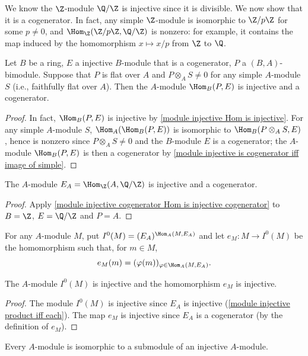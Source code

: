 \begin{example}
We know the $\Z$-module $\Q/\Z$ is injective since it is divisible. We now show that it is a cogenerator. In fact, any simple $\Z$-module is isomorphic to $\Z/p\Z$ for some $p\neq 0$, and $\Hom_\Z(\Z/p\Z,\Q/\Z)$ is nonzero: for example, it contains the map induced by the homomorphism $x\mapsto x/p$ from $\Z$ to $\Q$.
\end{example}
\begin{proposition}\label{module injective cogenerator Hom is injective cogenerator}
Let $B$ be a ring, $E$ a injective $B$-module that is a cogenerator, $P$ a $(B,A)$-bimodule. Suppose that $P$ is flat over $A$ and $P\otimes_AS\neq 0$ for any simple $A$-module $S$ (i.e., faithfully flat over $A$). Then the $A$-module $\Hom_B(P,E)$ is injective and a cogenerator.
\end{proposition}
\begin{proof}
In fact, $\Hom_B(P,E)$ is injective by \cref{module injective Hom is injective}. For any simple $A$-module $S$, $\Hom_A(\Hom_B(P,E))$ is isomorphic to $\Hom_B(P\otimes_AS,E)$, hence is nonzero since $P\otimes_AS\neq 0$ and the $B$-module $E$ is a cogenerator; the $A$-module $\Hom_B(P,E)$ is then a cogenerator by \cref{module injective is cogenerator iff image of simple}.
\end{proof}
\begin{corollary}\label{module Hom(A,Q/Z) is cogenerator}
The $A$-module $E_A=\Hom_{\Z}(A,\Q/\Z)$ is injective and a cogenerator.
\end{corollary}
\begin{proof}
Apply \cref{module injective cogenerator Hom is injective cogenerator} to $B=\Z$, $E=\Q/\Z$ and $P=A$.
\end{proof}
For any $A$-module $M$, put $I^0(M)=(E_A)^{\Hom_A(M,E_A)}$ and let $e_M:M\to I^0(M)$ be the homomorphism such that, for $m\in M$,
\[e_M(m)=(\varphi(m))_{\varphi\in\Hom_A(M,E_A)}.\]
\begin{corollary}\label{module embedded to I^0}
The $A$-module $I^0(M)$ is injective and the homomorphism $e_M$ is injective.
\end{corollary}
\begin{proof}
The module $I^0(M)$ is injective since $E_A$ is injective (\cref{module injective product iff each}). The map $e_M$ is injective since $E_A$ is a cogenerator (by the definition of $e_M$).
\end{proof}
\begin{corollary}\label{module embedded to injective}
Every $A$-module is isomorphic to a submodule of an injective $A$-module.
\end{corollary}

